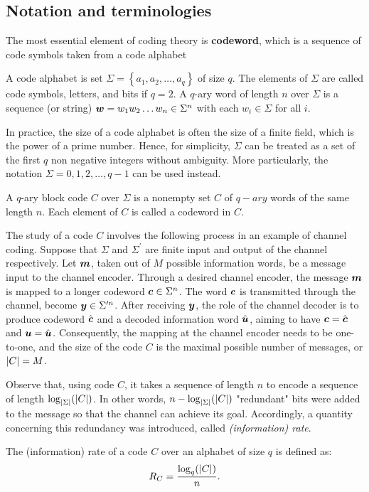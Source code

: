 \subsection{Notation and terminologies}
The most essential element of coding theory is \textbf{codeword}, which is a sequence of code symbols taken from a code alphabet
\begin{definition}
    A code alphabet is set $\Sigma=\left\{a_{1},a_{2},\ldots,a_{q}\right\}$ of size $q$. The elements of $\Sigma$ are called code symbols, letters, and bits if $q=2$. A $q$-ary word of length $n$ over $\Sigma$ is a sequence (or string) ${\boldsymbol w}=w_{1}w_{2}\ldots w_{n}\in\Sigma^{n}$ with each $w_{i}\in\Sigma$ for all $i$. 
\end{definition}
In practice, the size of a code alphabet is often the size of a finite field, which is the power of a prime number. Hence, for simplicity, $\Sigma$ can be treated as a set of the first $q$ non negative integers without ambiguity. More particularly, the notation $\Sigma={0,1,2,\ldots,q-1}$ can be used instead.
\begin{definition}
    A $q$-ary block code $C$ over $\Sigma$ is a nonempty set $C$ of $q-ary$ words of the same length $n$. Each element of $C$ is called a codeword in $C$.
\end{definition}
The study of a code $C$ involves the following process in an example of channel coding. Suppose that $\Sigma$ and $\Sigma^{\prime}$ are finite input and output of the channel respectively. Let ${\boldsymbol m}$, taken out of $M$ possible information words, be a message input to the channel encoder. Through a desired channel encoder, the message ${\boldsymbol m}$ is mapped to a longer codeword ${\boldsymbol c}\in\Sigma^{n}$. The word ${\boldsymbol c}$ is transmitted through the channel, become ${\boldsymbol y}\in\Sigma^{\prime n}$. After receiving ${\boldsymbol y}$, the role of the channel decoder is to produce codeword $\hat{{\boldsymbol c}}$ and a decoded information word $\hat{{\boldsymbol u}}$, aiming to have ${\boldsymbol c}=\hat{{\boldsymbol c}}$ and ${\boldsymbol u}=\hat{{\boldsymbol u}}$. Consequently, the mapping at the channel encoder needs to be one-to-one, and the size of the code $C$ is the maximal possible number of messages, or $\left \lvert C \right \rvert=M$.

Observe that, using code $C$, it takes a sequence of length $n$ to encode a sequence of length $\log_{\left \lvert \Sigma \right \rvert}(\left \lvert C \right \rvert)$. In other words, $n-\log_{\left \lvert \Sigma \right \rvert}(\left \lvert C \right \rvert)$ "redundant" bits were added to the message so that the channel can achieve its goal. Accordingly, a quantity concerning this redundancy was introduced, called \textit{(information) rate}. 
\begin{definition}\label{def:information_rate}
    The (information) rate of a code $C$ over an alphabet of size $q$ is defined as:
    \begin{align}
        R_{C}= \dfrac{\log_{q}(\left \lvert C \right \rvert)}{n}.
    \end{align}
\end{definition}

